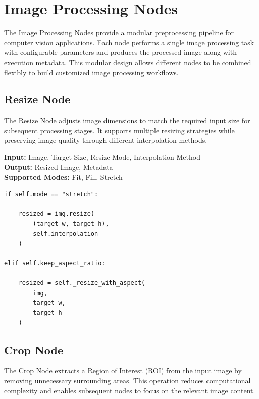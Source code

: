 \documentclass[a4paper,12pt]{report}
\begin{document}
\setcounter{chapter}{2}
\setcounter{section}{0}
\chapter*{Image Processing Nodes}
\label{chap:image-processing-nodes}

The Image Processing Nodes provide a modular preprocessing pipeline for
computer vision applications. Each node performs a single image processing
task with configurable parameters and produces the processed image along
with execution metadata. This modular design allows different nodes to be
combined flexibly to build customized image processing workflows.

\section{Resize Node}
\label{sec:resize-node}

The Resize Node adjusts image dimensions to match the required input size
for subsequent processing stages. It supports multiple resizing strategies
while preserving image quality through different interpolation methods.

\noindent \textbf{Input:} Image, Target Size, Resize Mode, Interpolation Method \\
\textbf{Output:} Resized Image, Metadata \\
\textbf{Supported Modes:} Fit, Fill, Stretch

\begin{lstlisting}[caption={Core Algorithm}, label={lst:resize-node}]
if self.mode == "stretch":

    resized = img.resize(
        (target_w, target_h),
        self.interpolation
    )

elif self.keep_aspect_ratio:

    resized = self._resize_with_aspect(
        img,
        target_w,
        target_h
    )
\end{lstlisting}

\section{Crop Node}
\label{sec:crop-node}

The Crop Node extracts a Region of Interest (ROI) from the input image by
removing unnecessary surrounding areas. This operation reduces
computational complexity and enables subsequent nodes to focus on the
relevant image content.
\end{document}
